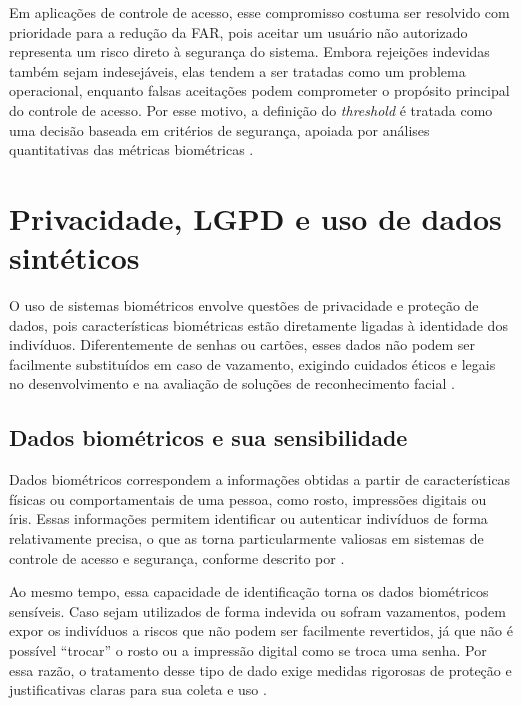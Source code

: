 Em aplicações de controle de acesso, esse compromisso costuma ser resolvido com prioridade para a redução da \acs{FAR}, pois aceitar um usuário não autorizado representa um risco direto à segurança do sistema. Embora rejeições indevidas também sejam indesejáveis, elas tendem a ser tratadas como um problema operacional, enquanto falsas aceitações podem comprometer o propósito principal do controle de acesso. Por esse motivo, a definição do \textit{threshold} é tratada como uma decisão baseada em critérios de segurança, apoiada por análises quantitativas das métricas biométricas \cite{jain2004biometric}.


\section{Privacidade, LGPD e uso de dados sintéticos}

O uso de sistemas biométricos envolve questões de privacidade e proteção de dados, pois características biométricas estão diretamente ligadas à identidade dos indivíduos. Diferentemente de senhas ou cartões, esses dados não podem ser facilmente substituídos em caso de vazamento, exigindo cuidados éticos e legais no desenvolvimento e na avaliação de soluções de reconhecimento facial \cite{ratha2001enhancing}.

\subsection{Dados biométricos e sua sensibilidade}

Dados biométricos correspondem a informações obtidas a partir de características físicas ou comportamentais de uma pessoa, como rosto, impressões digitais ou íris. Essas informações permitem identificar ou autenticar indivíduos de forma relativamente precisa, o que as torna particularmente valiosas em sistemas de controle de acesso e segurança, conforme descrito por \textcite{jain2004biometric}.

Ao mesmo tempo, essa capacidade de identificação torna os dados biométricos sensíveis. Caso sejam utilizados de forma indevida ou sofram vazamentos, podem expor os indivíduos a riscos que não podem ser facilmente revertidos, já que não é possível “trocar” o rosto ou a impressão digital como se troca uma senha. Por essa razão, o tratamento desse tipo de dado exige medidas rigorosas de proteção e justificativas claras para sua coleta e uso \cite{ratha2001enhancing}.

